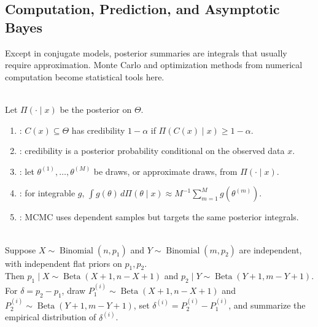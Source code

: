 \subsection{Computation, Prediction, and Asymptotic Bayes}

Except in conjugate models, posterior summaries are integrals that usually require approximation.  Monte Carlo and optimization methods from numerical computation become statistical tools here.

\begin{definition} \label{def:bayesian-credible-set} \label{def:mcmc-posterior-integration} \\
Let $\Pi(\cdot\mid x)$ be the posterior on $\Theta$.
\begin{enumerate}[label=(\roman*)]
\setlength{\itemsep}{0pt}
\item {}: $C(x)\subseteq\Theta$ has credibility $1-\alpha$ if $\Pi(C(x)\mid x)\geq1-\alpha$.
\item {}: credibility is a posterior probability conditional on the observed data $x$.
\item {}: let $\theta^{(1)},\ldots,\theta^{(M)}$ be draws, or approximate draws, from $\Pi(\cdot\mid x)$.
\item {}: for integrable $g$, $\int g(\theta)\,d\Pi(\theta\mid x)\approx M^{-1}\sum\limits_{m=1}^Mg(\theta^{(m)})$.
\item {}: MCMC uses dependent samples but targets the same posterior integrals.
\end{enumerate}
\end{definition}

\begin{example} \label{ex:two-binomial-posterior-simulation} \\
Suppose $X\sim\operatorname{Binomial}(n,p_1)$ and $Y\sim\operatorname{Binomial}(m,p_2)$ are independent, with independent flat priors on $p_1,p_2$.\\
Then $p_1\mid X\sim\operatorname{Beta}(X+1,n-X+1)$ and $p_2\mid Y\sim\operatorname{Beta}(Y+1,m-Y+1)$.\\
For $\delta=p_2-p_1$, draw $P_1^{(i)}\sim\operatorname{Beta}(X+1,n-X+1)$ and $P_2^{(i)}\sim\operatorname{Beta}(Y+1,m-Y+1)$, set $\delta^{(i)}=P_2^{(i)}-P_1^{(i)}$, and summarize the empirical distribution of $\delta^{(i)}$.
\end{example}

